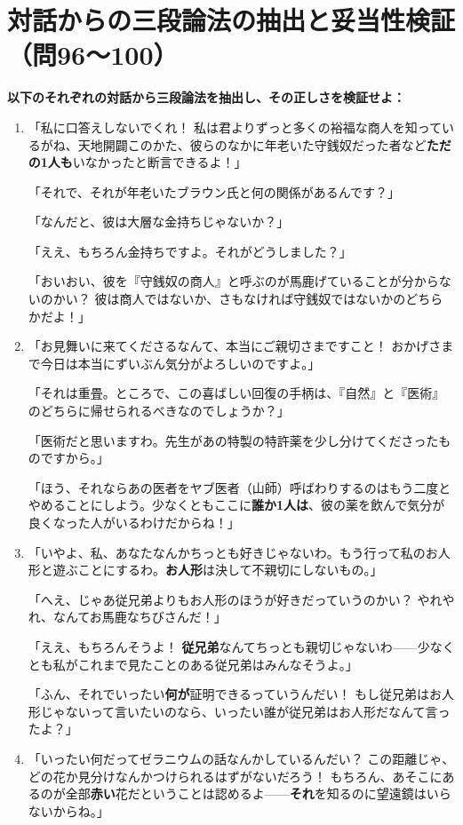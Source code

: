 \documentclass[a4paper,11pt,openany]{ltjsbook}
\begin{document}
\vspace{4mm}
\section*{対話からの三段論法の抽出と妥当性検証（問96〜100）}
\noindent\textbf{以下のそれぞれの対話から三段論法を抽出し、その正しさを検証せよ：}

\begin{enumerate}[label=\textbf{\arabic*.}, start=96]
\item 「私に口答えしないでくれ！ 私は君よりずっと多くの裕福な商人を知っているがね、天地開闢このかた、彼らのなかに年老いた守銭奴だった者など\textbf{ただの1人も}いなかったと断言できるよ！」

「それで、それが年老いたブラウン氏と何の関係があるんです？」

「なんだと、彼は大層な金持ちじゃないか？」

「ええ、もちろん金持ちですよ。それがどうしました？」

「おいおい、彼を『守銭奴の商人』と呼ぶのが馬鹿げていることが分からないのかい？ 彼は商人ではないか、さもなければ守銭奴ではないかのどちらかだよ！」
\item 「お見舞いに来てくださるなんて、本当にご親切さまですこと！ おかげさまで今日は本当にずいぶん気分がよろしいのですよ。」

「それは重畳。ところで、この喜ばしい回復の手柄は、『自然』と『医術』のどちらに帰せられるべきなのでしょうか？」

「医術だと思いますわ。先生があの特製の特許薬を少し分けてくださったものですから。」

「ほう、それならあの医者をヤブ医者（山師）呼ばわりするのはもう二度とやめることにしよう。少なくともここに\textbf{誰か1人は}、彼の薬を飲んで気分が良くなった人がいるわけだからね！」
\item 「いやよ、私、あなたなんかちっとも好きじゃないわ。もう行って私のお人形と遊ぶことにするわ。\textbf{お人形}は決して不親切にしないもの。」

「へえ、じゃあ従兄弟よりもお人形のほうが好きだっていうのかい？ やれやれ、なんてお馬鹿なちびさんだ！」

「ええ、もちろんそうよ！ \textbf{従兄弟}なんてちっとも親切じゃないわ——少なくとも私がこれまで見たことのある従兄弟はみんなそうよ。」

「ふん、それでいったい\textbf{何が}証明できるっていうんだい！ もし従兄弟はお人形じゃないって言いたいのなら、いったい誰が従兄弟はお人形だなんて言ったよ？」
\item 「いったい何だってゼラニウムの話なんかしているんだい？ この距離じゃ、どの花か見分けなんかつけられるはずがないだろう！ もちろん、あそこにあるのが全部\textbf{赤い}花だということは認めるよ——\textbf{それ}を知るのに望遠鏡はいらないからね。」


\end{enumerate}
\end{document}
